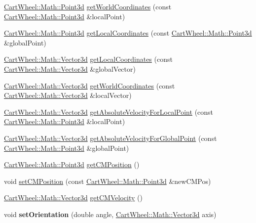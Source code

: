 \begin{DoxyCompactItemize}
\item 
\hyperlink{classCartWheel_1_1Math_1_1Point3d}{CartWheel::Math::Point3d} \hyperlink{classCartWheel_1_1Physics_1_1RigidBody_ae83135dc1e3f7ab85541ce67d636af98}{getWorldCoordinates} (const \hyperlink{classCartWheel_1_1Math_1_1Point3d}{CartWheel::Math::Point3d} \&localPoint)
\item 
\hyperlink{classCartWheel_1_1Math_1_1Point3d}{CartWheel::Math::Point3d} \hyperlink{classCartWheel_1_1Physics_1_1RigidBody_a142142b4060b01345f76f6dcaab89b98}{getLocalCoordinates} (const \hyperlink{classCartWheel_1_1Math_1_1Point3d}{CartWheel::Math::Point3d} \&globalPoint)
\item 
\hyperlink{classCartWheel_1_1Math_1_1Vector3d}{CartWheel::Math::Vector3d} \hyperlink{classCartWheel_1_1Physics_1_1RigidBody_a4c5e4189ad6b5ab79ffb4670cbda67e6}{getLocalCoordinates} (const \hyperlink{classCartWheel_1_1Math_1_1Vector3d}{CartWheel::Math::Vector3d} \&globalVector)
\item 
\hyperlink{classCartWheel_1_1Math_1_1Vector3d}{CartWheel::Math::Vector3d} \hyperlink{classCartWheel_1_1Physics_1_1RigidBody_ac333a6a3cf33bedfb73b37b6590a732e}{getWorldCoordinates} (const \hyperlink{classCartWheel_1_1Math_1_1Vector3d}{CartWheel::Math::Vector3d} \&localVector)
\item 
\hyperlink{classCartWheel_1_1Math_1_1Vector3d}{CartWheel::Math::Vector3d} \hyperlink{classCartWheel_1_1Physics_1_1RigidBody_a41e008a18204263356311816ee5039c2}{getAbsoluteVelocityForLocalPoint} (const \hyperlink{classCartWheel_1_1Math_1_1Point3d}{CartWheel::Math::Point3d} \&localPoint)
\item 
\hyperlink{classCartWheel_1_1Math_1_1Vector3d}{CartWheel::Math::Vector3d} \hyperlink{classCartWheel_1_1Physics_1_1RigidBody_a8876796e4d15bec1a363f0fd550dad19}{getAbsoluteVelocityForGlobalPoint} (const \hyperlink{classCartWheel_1_1Math_1_1Point3d}{CartWheel::Math::Point3d} \&globalPoint)
\item 
\hyperlink{classCartWheel_1_1Math_1_1Point3d}{CartWheel::Math::Point3d} \hyperlink{classCartWheel_1_1Physics_1_1RigidBody_a55bb99a033e6c6808d0a447ca92f9d3d}{getCMPosition} ()
\item 
void \hyperlink{classCartWheel_1_1Physics_1_1RigidBody_a5febf2c580bc7085209f046e86b49229}{setCMPosition} (const \hyperlink{classCartWheel_1_1Math_1_1Point3d}{CartWheel::Math::Point3d} \&newCMPos)
\item 
\hyperlink{classCartWheel_1_1Math_1_1Vector3d}{CartWheel::Math::Vector3d} \hyperlink{classCartWheel_1_1Physics_1_1RigidBody_a60df7d8402d6bc8bab75cb5b5a790920}{getCMVelocity} ()
\item 
\hypertarget{classCartWheel_1_1Physics_1_1RigidBody_a6d93fb9611e05fa3358e67490e37cd4c}{
void {\bfseries setOrientation} (double angle, \hyperlink{classCartWheel_1_1Math_1_1Vector3d}{CartWheel::Math::Vector3d} axis)}
\label{classCartWheel_1_1Physics_1_1RigidBody_a6d93fb9611e05fa3358e67490e37cd4c}


\end{DoxyCompactItemize}
